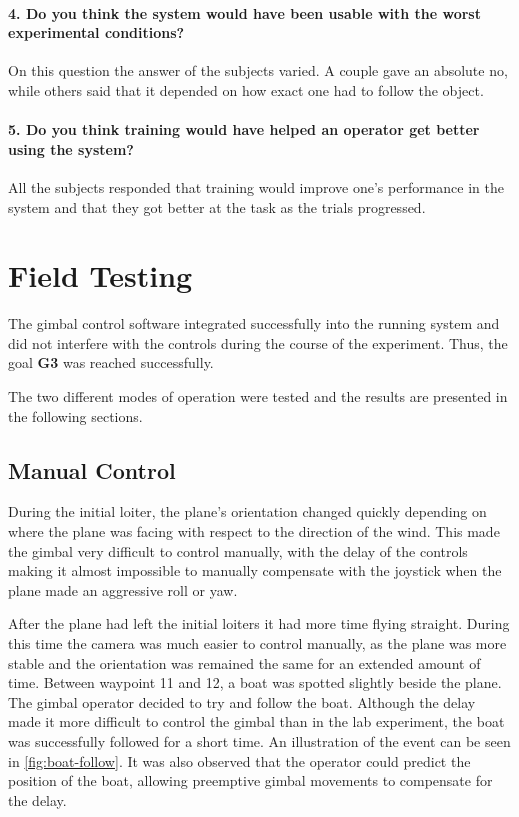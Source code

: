 \documentclass[nofilelist]{cslthse-msc}
\begin{document}
\paragraph{4. Do you think the system would have been usable with the worst experimental conditions?}
On this question the answer of the subjects varied. A couple gave an absolute no, while others said that it depended on how exact one had to follow the object. 

\paragraph{5. Do you think training would have helped an operator get better using the system?}
All the subjects responded that training would improve one's performance in the system and that they got better at the task as the trials progressed. 

\section{Field Testing}
The gimbal control software integrated successfully into the running system and did not interfere with the controls during the course of the experiment. Thus, the goal \textbf{G3} was reached successfully.

The two different modes of operation were tested and the results are presented in the following sections.

\subsection{Manual Control}
During the initial loiter, the plane's orientation changed quickly depending on where the plane was facing with respect to the direction of the wind. This made the gimbal very difficult to control manually, with the delay of the controls making it almost impossible to manually compensate with the joystick when the plane made an aggressive roll or yaw.

After the plane had left the initial loiters it had more time flying straight. During this time the camera was much easier to control manually, as the plane was more stable and the orientation was remained the same for an extended amount of time. 
Between waypoint 11 and 12, a boat was spotted slightly beside the plane. The gimbal operator decided to try and follow the boat. Although the delay made it more difficult to control the gimbal than in the lab experiment, the boat was successfully followed for a short time. An illustration of the event can be seen in \ref{fig:boat-follow}. It was also observed that the operator could predict the position of the boat, allowing preemptive gimbal movements to compensate for the delay. 
\end{document}
